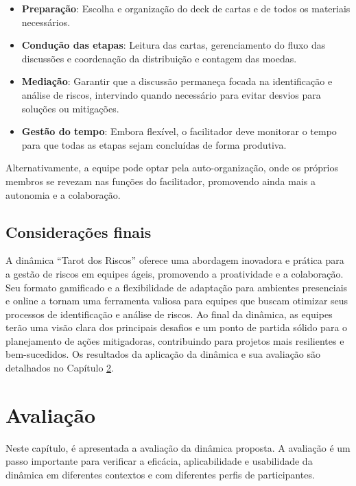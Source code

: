 \documentclass[
	12pt,
	openright,
	twoside,
	a4paper,
	english,
	brazil
	]{abntex2}
\begin{document}
\begin{itemize}
  \item \textbf{Preparação}: Escolha e organização do deck de cartas e de todos os materiais necessários.
  \item \textbf{Condução das etapas}: Leitura das cartas, gerenciamento do fluxo das discussões e coordenação da distribuição e contagem das moedas.
  \item \textbf{Mediação}: Garantir que a discussão permaneça focada na identificação e análise de riscos, intervindo quando necessário para evitar desvios para soluções ou mitigações.
  \item \textbf{Gestão do tempo}: Embora flexível, o facilitador deve monitorar o tempo para que todas as etapas sejam concluídas de forma produtiva.
\end{itemize}

Alternativamente, a equipe pode optar pela auto-organização, onde os próprios membros se revezam nas funções do facilitador, promovendo ainda mais a autonomia e a colaboração.

\section{Considerações finais}
\label{sec:consideracoes-finais-cap5}

A dinâmica “Tarot dos Riscos” oferece uma abordagem inovadora e prática para a gestão de riscos em equipes ágeis, promovendo a proatividade e a colaboração. Seu formato gamificado e a flexibilidade de adaptação para ambientes presenciais e online a tornam uma ferramenta valiosa para equipes que buscam otimizar seus processos de identificação e análise de riscos. Ao final da dinâmica, as equipes terão uma visão clara dos principais desafios e um ponto de partida sólido para o planejamento de ações mitigadoras, contribuindo para projetos mais resilientes e bem-sucedidos. Os resultados da aplicação da dinâmica e sua avaliação são detalhados no Capítulo \ref{cap:avaliacao}.


\chapter{Avaliação}
\label{cap:avaliacao}

Neste capítulo, é apresentada a avaliação da dinâmica proposta. A avaliação é um passo importante para verificar a eficácia, aplicabilidade e usabilidade da dinâmica em diferentes contextos e com diferentes perfis de participantes.
\end{document}

